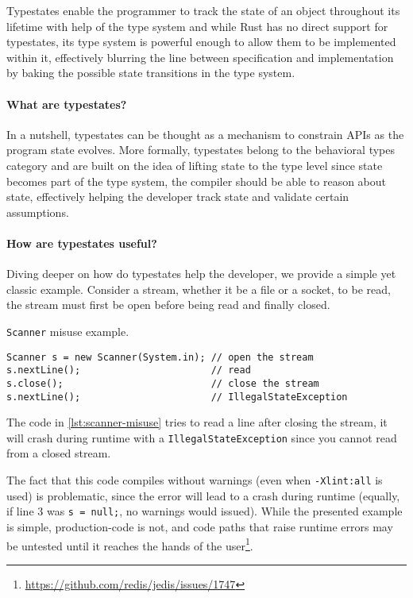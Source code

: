 \documentclass[a4paper, 10pt]{article}
\newenvironment{code}{\captionsetup{type=listing}}{}
\begin{document}
Typestates enable the programmer to track the state of an object throughout its lifetime with help of the type system
and while Rust has no direct support for typestates,
its type system is powerful enough to allow them to be implemented within it,
effectively blurring the line between specification and implementation by baking the possible state transitions in the type system.



\paragraph{What are typestates?}
In a nutshell, typestates can be thought as a mechanism to constrain APIs as the program state evolves.
More formally, typestates belong to the behavioral types category and
are built on the idea of lifting state to the type level since state becomes part of the type system,
the compiler should be able to reason about state,
effectively helping the developer track state and validate certain assumptions.

\paragraph{How are typestates useful?}
Diving deeper on how do typestates help the developer, we provide a simple yet classic example.
Consider a stream, whether it be a file or a socket, to be read, the stream must first be open before being read and finally closed.

\begin{code}
    \caption{\texttt{Scanner} misuse example.}
    \label{lst:scanner-misuse}
    \begin{verbatim}
Scanner s = new Scanner(System.in); // open the stream
s.nextLine();                       // read
s.close();                          // close the stream
s.nextLine();                       // IllegalStateException
    \end{verbatim}
\end{code}

The code in \autoref{lst:scanner-misuse} tries to read a line after closing the stream,
it will crash during runtime with a \texttt{IllegalStateException} since you cannot read from a closed stream.

The fact that this code compiles without warnings (even when \texttt{-Xlint:all} is used) is problematic,
since the error will lead to a crash during runtime
(equally, if line 3 was \texttt{s = null;}, no warnings would issued).
While the presented example is simple, production-code is not,
and code paths that raise runtime errors may be untested until it reaches the hands of the user\footnote{\url{https://github.com/redis/jedis/issues/1747}}.
\end{document}
